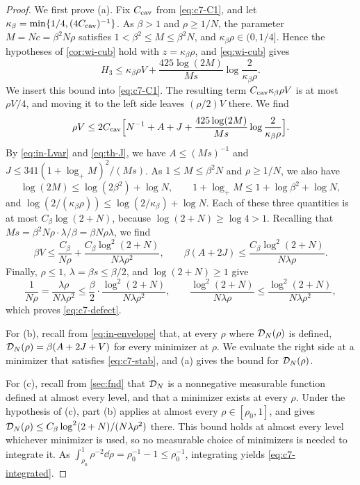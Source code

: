 \begin{proof}
We first prove (a). Fix $C_{\rm cav}$ from \eqref{eq:c7-C1}, and let
$\kappa_\beta=\min\{1/4,(4C_{\rm cav})^{-1}\}$. As $\beta>1$ and
$\rho\ge1/N$, the parameter $M=Nc=\beta^2N\rho$ satisfies
$1<\beta^2\le M\le\beta^2N$, and $\kappa_\beta\rho\in(0,1/4]$. Hence the
hypotheses of \cref{cor:wi-cub} hold with $z=\kappa_\beta\rho$, and
\eqref{eq:wi-cub} gives
\[
 H_3\le\kappa_\beta\rho V
   +\frac{425\log(2M)}{Ms}\log\frac2{\kappa_\beta\rho}.
\]
We insert this bound into \eqref{eq:c7-C1}. The resulting term
$C_{\rm cav}\kappa_\beta\rho V$ is at most $\rho V/4$, and moving it to
the left side leaves $(\rho/2)V$ there. We find
\[
 \rho V\le2C_{\rm cav}\Bigl[N^{-1}+A+J
   +\frac{425\log(2M)}{Ms}\log\frac2{\kappa_\beta\rho}\Bigr].
\]
By \eqref{eq:in-Lvar} and \eqref{eq:th-J}, we have $A\le(Ms)^{-1}$ and
$J\le341(1+\log_+M)^2/(Ms)$. As $1\le M\le\beta^2N$ and $\rho\ge1/N$, we
also have
\[
 \log(2M)\le\log(2\beta^2)+\log N,\qquad
 1+\log_+M\le1+\log\beta^2+\log N,
\]
and $\log(2/(\kappa_\beta\rho))\le\log(2/\kappa_\beta)+\log N$. Each of
these three quantities is at most $C_\beta\log(2+N)$, because
$\log(2+N)\ge\log4>1$. Recalling that
$Ms=\beta^2N\rho\cdot\lambda/\beta=\beta N\rho\lambda$, we find
\[
 \beta V\le\frac{C_\beta}{N\rho}
   +\frac{C_\beta\log^2(2+N)}{N\lambda\rho^2},\qquad
 \beta(A+2J)\le\frac{C_\beta\log^2(2+N)}{N\lambda\rho}.
\]
Finally, $\rho\le1$, $\lambda=\beta s\le\beta/2$, and $\log(2+N)\ge1$
give
\[
 \frac1{N\rho}=\frac{\lambda\rho}{N\lambda\rho^2}
 \le\frac\beta2\cdot\frac{\log^2(2+N)}{N\lambda\rho^2},
 \qquad
 \frac{\log^2(2+N)}{N\lambda\rho}\le\frac{\log^2(2+N)}{N\lambda\rho^2},
\]
which proves \eqref{eq:c7-defect}.

For (b), recall from \eqref{eq:in-envelope} that, at every $\rho$ where
$\mathcal D_N(\rho)$ is defined, $\mathcal D_N(\rho)=\beta(A+2J+V)$ for every
minimizer at $\rho$. We evaluate the right side at a minimizer that
satisfies \eqref{eq:c7-stab}, and (a) gives the bound for
$\mathcal D_N(\rho)$.

For (c), recall from \cref{sec:fnd} that $\mathcal D_N$ is a nonnegative
measurable function defined at almost every level, and that a minimizer
exists at every $\rho$. Under the hypothesis of (c), part (b) applies at
almost every $\rho\in[\rho_0,1]$, and gives
$\mathcal D_N(\rho)\le C_\beta\log^2(2+N)/(N\lambda\rho^2)$ there. This bound
holds at almost every level whichever minimizer is used, so no
measurable choice of minimizers is needed to integrate it. As
$\int_{\rho_0}^1\rho^{-2}\dd\rho=\rho_0^{-1}-1\le\rho_0^{-1}$,
integrating yields \eqref{eq:c7-integrated}.
\end{proof}
